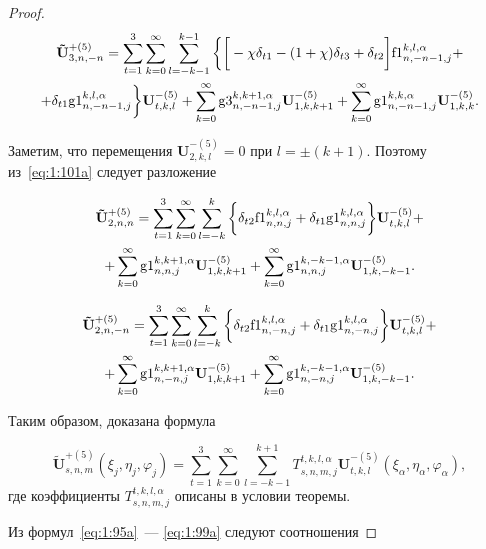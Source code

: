 \begin{proof}
\begin{multline}
\mathbf{\tilde U}_{3,n,-n}^{+(5)}=\sum\limits_{t=1}^3\sum\limits_{k=0}^\infty\sum\limits_{l=-k-1}^{k-1}\bigg\{\bigg\lbrack-\chi\delta_{t1}-(1+\chi)\delta_{t3}+\delta_{t2}\bigg\rbrack{\rm f1}_{n,-n-1,j}^{k,l,\alpha}+ \\
+\delta_{t1}{\rm g1}_{n,-n-1,j}^{k,l,\alpha}\bigg\}\mathbf{U}_{t,k,l}^{-(5)}+\sum\limits_{k=0}^\infty{\rm g3}_{n,-n-1,j}^{k,k+1,\alpha}\mathbf{U}_{1,k,k+1}^{-(5)}+\sum\limits_{k=0}^\infty{\rm g1}_{n,-n-1,j}^{k,k,\alpha}\mathbf{U}_{1,k,k}^{-(5)}.
\label{eq:1:111p}
\end{multline}

Заметим, что перемещения $\mathbf{U}_{2,k,l}^{-(5)}=0$ при $l=\pm(k+1)$. Поэтому из~\eqref{eq:1:101a} следует разложение

\begin{multline}
\mathbf{\tilde U}_{2,n,n}^{+(5)}=\sum\limits_{t=1}^3\sum\limits_{k=0}^\infty\sum\limits_{l=-k}^{k}\bigg\{\delta_{t2}{\rm f1}_{n,n,j}^{k,l,\alpha}+\delta_{t1}{\rm g1}_{n,n,j}^{k,l,\alpha}\bigg\}\mathbf{U}_{t,k,l}^{-(5)}+ \\
+\sum\limits_{k=0}^\infty{\rm g1}_{n,n,j}^{k,k+1,\alpha}\mathbf{U}_{1,k,k+1}^{-(5)}+\sum\limits_{k=0}^\infty{\rm g1}_{n,n,j}^{k,-k-1,\alpha}\mathbf{U}_{1,k,-k-1}^{-(5)}.
\label{eq:1:112p}
\end{multline}

\begin{multline}
\mathbf{\tilde U}_{2,n,-n}^{+(5)}=\sum\limits_{t=1}^3\sum\limits_{k=0}^\infty\sum\limits_{l=-k}^{k}\bigg\{\delta_{t2}{\rm f1}_{n,-n,j}^{k,l,\alpha}+\delta_{t1}{\rm g1}_{n,-n,j}^{k,l,\alpha}\bigg\}\mathbf{U}_{t,k,l}^{-(5)}+ \\
+\sum\limits_{k=0}^\infty{\rm g1}_{n,-n,j}^{k,k+1,\alpha}\mathbf{U}_{1,k,k+1}^{-(5)}+\sum\limits_{k=0}^\infty{\rm g1}_{n,-n,j}^{k,-k-1,\alpha}\mathbf{U}_{1,k,-k-1}^{-(5)}.
\label{eq:1:113p}
\end{multline}

Таким образом, доказана формула

\begin{equation}
\mathbf{\tilde U}_{s,n,m}^{+(5)}(\xi_j,\eta_j,\varphi_j)=\sum\limits_{t=1}^3\sum\limits_{k=0}^\infty\sum\limits_{l=-k-1}^{k+1}T_{s,n,m,j}^{t,k,l,\alpha}\mathbf{U}_{t,k,l}^{-(5)}(\xi_\alpha,\eta_\alpha,\varphi_\alpha),
\label{eq:1:114p}
\end{equation}
где коэффициенты $T_{s,n,m,j}^{t,k,l,\alpha}$ описаны в условии теоремы.

Из формул~\eqref{eq:1:95a}~--- \eqref{eq:1:99a} следуют соотношения


\end{proof}
